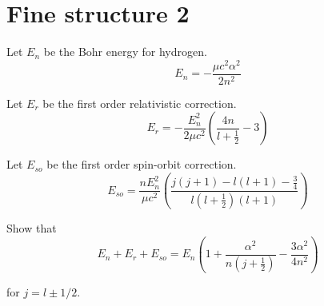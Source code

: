 

\section*{Fine structure 2}

Let $E_n$ be the Bohr energy for hydrogen.
\begin{equation*}
E_n=-\frac{\mu c^2\alpha^2}{2n^2}
\end{equation*}

Let $E_r$ be the first order relativistic correction.
\begin{equation*}
E_r=-\frac{E_n^2}{2\mu c^2}\left(\frac{4n}{l+\frac{1}{2}}-3\right)
\end{equation*}

Let $E_{so}$ be the first order spin-orbit correction.
\begin{equation*}
E_{so}=\frac{nE_n^2}{\mu c^2}
\left(\frac{j(j+1)-l(l+1)-\frac{3}{4}}{l\left(l+\frac{1}{2}\right)(l+1)}\right)
\end{equation*}

Show that
\begin{equation*}
E_n+E_r+E_{so}=E_n
\left(1+\frac{\alpha^2}{n\left(j+\frac{1}{2}\right)}-\frac{3\alpha^2}{4n^2}\right)
\tag{1}
\end{equation*}

for $j=l\pm1/2$.



